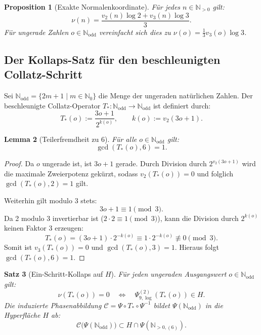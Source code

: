 \documentclass[11pt,a4paper]{article}
\theoremstyle{plain}
\newtheorem{theorem}{Satz}[section]
\newtheorem{lemma}[theorem]{Lemma}
\newtheorem{proposition}[theorem]{Proposition}
\theoremstyle{definition}
\newcommand{\N}{\mathbb{N}}
\begin{document}
\begin{proposition}[Exakte Normalenkoordinate]
Für jedes $n \in \N_{>0}$ gilt:
\begin{equation}
    \nu(n) = \frac{v_2(n)\log 2 + v_3(n)\log 3}{3}.
\end{equation}
Für ungerade Zahlen $o \in \N_{\mathrm{odd}}$ vereinfacht sich dies zu $\nu(o) = \frac{1}{3} v_3(o)\log 3$.
\end{proposition}

\subsection{Der Kollaps-Satz für den beschleunigten Collatz-Schritt}

Sei $\N_{\mathrm{odd}} = \{2m+1 \mid m \in \N_0\}$ die Menge der ungeraden natürlichen Zahlen. Der beschleunigte Collatz-Operator $T_*: \N_{\mathrm{odd}} \to \N_{\mathrm{odd}}$ ist definiert durch:
\begin{equation}
    T_*(o) := \frac{3o+1}{2^{k(o)}}, \qquad k(o) := v_2(3o+1).
\end{equation}

\begin{lemma}[Teilerfremdheit zu 6]
\label{lem:gcd6}
Für alle $o \in \N_{\mathrm{odd}}$ gilt:
\begin{equation}
    \gcd(T_*(o), 6) = 1.
\end{equation}
\end{lemma}

\begin{proof}
Da $o$ ungerade ist, ist $3o+1$ gerade. Durch Division durch $2^{v_2(3o+1)}$ wird die maximale Zweierpotenz gekürzt, sodass $v_2(T_*(o)) = 0$ und folglich $\gcd(T_*(o), 2) = 1$ gilt.

Weiterhin gilt modulo 3 stets:
\begin{equation}
    3o+1 \equiv 1 \pmod 3.
\end{equation}
Da 2 modulo 3 invertierbar ist ($2 \cdot 2 \equiv 1 \pmod 3$), kann die Division durch $2^{k(o)}$ keinen Faktor 3 erzeugen:
\begin{equation}
    T_*(o) = (3o+1) \cdot 2^{-k(o)} \equiv 1 \cdot 2^{-k(o)} \not\equiv 0 \pmod 3.
\end{equation}
Somit ist $v_3(T_*(o)) = 0$ und $\gcd(T_*(o), 3) = 1$. Hieraus folgt $\gcd(T_*(o), 6) = 1$.
\end{proof}

\begin{theorem}[Ein-Schritt-Kollaps auf $H$]
\label{thm:collatz_collapse}
Für jeden ungeraden Ausgangswert $o \in \N_{\mathrm{odd}}$ gilt:
\begin{equation}
    \nu(T_*(o)) = 0 \quad \Longleftrightarrow \quad \Psi_{9,\log}^{(2)}(T_*(o)) \in H.
\end{equation}
Die induzierte Phasenabbildung $\mathcal{C} = \Psi \circ T_* \circ \Psi^{-1}$ bildet $\Psi(\N_{\mathrm{odd}})$ in die Hyperfläche $H$ ab:
\begin{equation}
    \mathcal{C}\bigl(\Psi(\N_{\mathrm{odd}})\bigr) \subset H \cap \Psi(\N_{>0,(6)}).
\end{equation}
\end{theorem}
\end{document}
